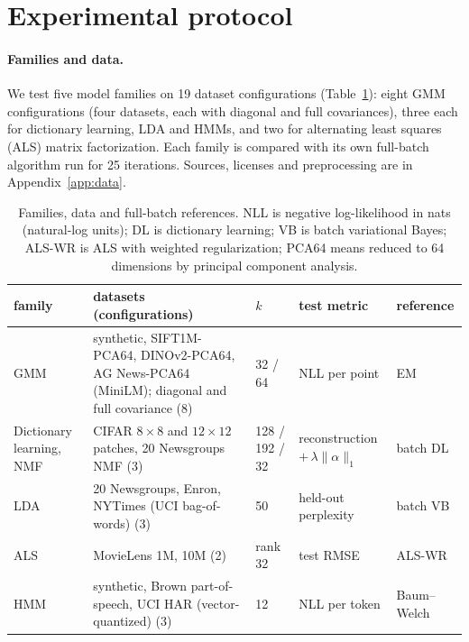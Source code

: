 \documentclass[10pt]{article}
\begin{document}
\section{Experimental protocol}\label{sec:protocol}

\paragraph{Families and data.} We test five model families on 19 dataset configurations (Table~\ref{tab:data}):
eight GMM configurations (four datasets, each with diagonal and full covariances), three each for dictionary learning,
LDA and HMMs, and two for alternating least squares (ALS) matrix factorization. Each family is compared with its own
full-batch algorithm run for 25 iterations. Sources, licenses and preprocessing are in Appendix~\ref{app:data}.

\begin{table}[!t]
\centering\small
\caption{Families, data and full-batch references. NLL is negative log-likelihood in nats (natural-log units);
DL is dictionary learning; VB is batch variational Bayes; ALS-WR is ALS with weighted regularization; PCA64 means
reduced to 64 dimensions by principal component analysis.}
\label{tab:data}
\begin{tabular}{p{2.9cm}p{5.8cm}p{1.7cm}p{2.3cm}p{1.6cm}}
\toprule
family & datasets (configurations) & $k$ & test metric & reference \\
\midrule
GMM & synthetic, SIFT1M-PCA64, DINOv2-PCA64, AG News-PCA64 (MiniLM); diagonal and full covariance (8) & 32 / 64 &
NLL per point & EM \\
Dictionary learning, NMF & CIFAR $8{\times}8$ and $12{\times}12$ patches, 20 Newsgroups NMF (3) & 128 / 192 / 32 &
reconstruction $+\, \lambda\|\alpha\|_1$ & batch DL \\
LDA & 20 Newsgroups, Enron, NYTimes (UCI bag-of-words) (3) & 50 & held-out perplexity & batch VB \\
ALS & MovieLens 1M, 10M (2) & rank 32 & test RMSE & ALS-WR \\
HMM & synthetic, Brown part-of-speech, UCI HAR (vector-quantized) (3) & 12 & NLL per token & Baum--Welch \\
\bottomrule
\end{tabular}
\end{table}
\end{document}
